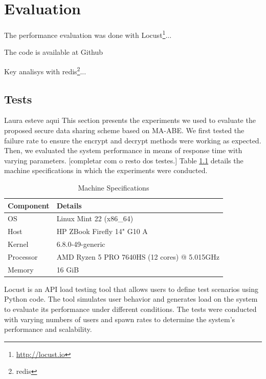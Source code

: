 \documentclass[cic,tc,english]{iiufrgs}
\begin{document}
\chapter{Evaluation}
    \label{chap:evaluation}
    The performance evaluation was done with Locust\footnote{\url{http://locust.io}}...

    The code is available at Github\citet{maabeflask}
    
    Key analisys with redis\footnote{redis}...

    \section{Tests}
        \label{sec:tests}

        \begin{draft}
            {Laura esteve aqui}
            This section presents the experiments we used to evaluate the proposed secure data sharing scheme based on MA-ABE. We first tested the failure rate to ensure the encrypt and decrypt methods were working as expected. Then, we evaluated the system performance in means of response time with varying parameters. [completar com o resto dos testes.] Table \ref{tab:machine_specs} details the machine specifications in which the experiments were conducted.
        \end{draft}

        \begin{table}[h]
            \centering
            \begin{tabular}{|l|l|}
            \hline
            \textbf{Component} & \textbf{Details} \\ \hline
            OS & Linux Mint 22 (x86\_64) \\ \hline
            Host & HP ZBook Firefly 14" G10 A \\ \hline
            Kernel & 6.8.0-49-generic \\ \hline
            Processor & AMD Ryzen 5 PRO 7640HS (12 cores) @ 5.015GHz \\ \hline
            Memory & 16 GiB \\ \hline
            \end{tabular}
            \caption{Machine Specifications}
            \label{tab:machine_specs}
        \end{table}

        Locust is an API load testing tool that allows users to define test scenarios using Python code. The tool simulates user behavior and generates load on the system to evaluate its performance under different conditions. The tests were conducted with varying numbers of users and spawn rates to determine the system's performance and scalability.
        
\end{document}
